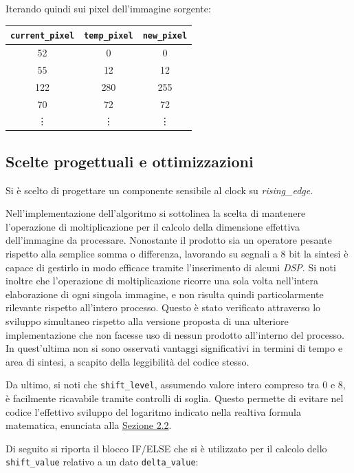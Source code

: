 \documentclass{article}
\begin{document}
Iterando quindi sui pixel dell'immagine sorgente:
\begin{center}
    \small
    \def\arraystretch{1.3} %
    \begin{tabular}{||c|c|c||} 
        \hline
        \texttt{current\_pixel} & \texttt{temp\_pixel} & \texttt{new\_pixel}\\
        \hline \hline
        52       & 0         & 0         \\\hline
        55       & 12        & 12        \\\hline
        122      & 280       & 255       \\\hline
        70       & 72        & 72        \\\hline
        \vdots   & \vdots    & \vdots    \\\hline
    \end{tabular}        
\end{center}
\vspace{0,3cm}

\subsection{Scelte progettuali e ottimizzazioni} %
Si è scelto di progettare un componente sensibile al clock su \emph{rising\_edge}.\par
Nell’implementazione dell’algoritmo si sottolinea la scelta di mantenere l’operazione di moltiplicazione per il calcolo della dimensione effettiva dell’immagine da processare. Nonostante il prodotto sia un operatore pesante rispetto alla semplice somma o differenza, lavorando su segnali a 8 bit la sintesi è capace di gestirlo in modo efficace tramite l’inserimento di alcuni \emph{DSP}\footnotemark.
Si noti inoltre che l’operazione di moltiplicazione ricorre una sola volta nell’intera elaborazione di ogni singola immagine, e non risulta quindi particolarmente rilevante rispetto all’intero processo. Questo è stato verificato attraverso lo sviluppo simultaneo rispetto alla versione proposta di una ulteriore implementazione che non facesse uso di nessun prodotto all’interno del processo. In quest’ultima non si sono osservati vantaggi significativi in termini di tempo e area di sintesi, a scapito della leggibilità del codice stesso.\par
Da ultimo, si noti che \texttt{shift\_level}, assumendo valore intero compreso tra 0 e 8, è facilmente ricavabile tramite controlli di soglia. Questo permette di evitare nel codice l’effettivo sviluppo del logaritmo indicato nella realtiva formula matematica, enunciata alla \hyperref[sec:appr]{Sezione 2.2}.\par 
Di seguito si riporta il blocco IF/ELSE che si è utilizzato per il calcolo dello \texttt{shift\_value} relativo a un dato \texttt{delta\_value}:
\end{document}
